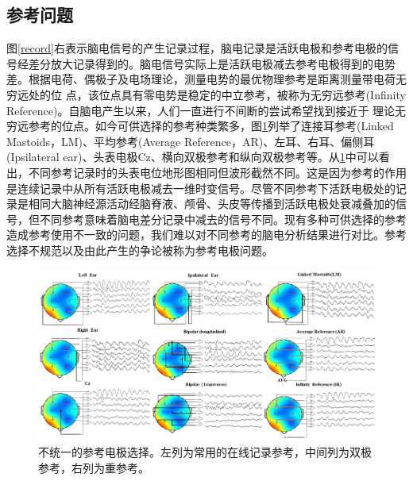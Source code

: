 \subsection{参考问题}
图\ref{record}右表示脑电信号的产生记录过程，脑电记录是活跃电极和参考电极的信号经差分放大记录得到的。脑电信号实际上是活跃电极减去参考电极得到的电势差。根据电荷、偶极子及电场理论，测量电势的最优物理参考是距离测量带电荷无穷远处的位
点，该位点具有零电势是稳定的中立参考，被称为无穷远参考(Infinity Reference)。自脑电产生以来，人们一直进行不间断的尝试希望找到接近于
理论无穷远参考的位点。如今可供选择的参考种类繁多，图\ref{ref}列举了连接耳参考(Linked Mastoids，LM)、平均参考(Average Reference，AR)、左耳、右耳、偏侧耳(Ipsilateral ear)、头表电极Cz、横向双极参考和纵向双极参考等。从\ref{ref}中可以看出，不同参考记录时的头表电位地形图相同但波形截然不同。这是因为参考的作用是连续记录中从所有活跃电极减去一维时变信号。尽管不同参考下活跃电极处的记录是相同大脑神经源活动经脑脊液、颅骨、头皮等传播到活跃电极处衰减叠加的信号，但不同参考意味着脑电差分记录中减去的信号不同。现有多种可供选择的参考造成参考使用不一致的问题，我们难以对不同参考的脑电分析结果进行对比。参考选择不规范以及由此产生的争论被称为参考电极问题。
\begin{figure}[!h]
	\includegraphics[width=15cm]{pic/xulun/EEGref.png}
	\caption{不统一的参考电极选择。左列为常用的在线记录参考，中间列为双极参考，右列为重参考。}
	\label{ref}
\end{figure}

